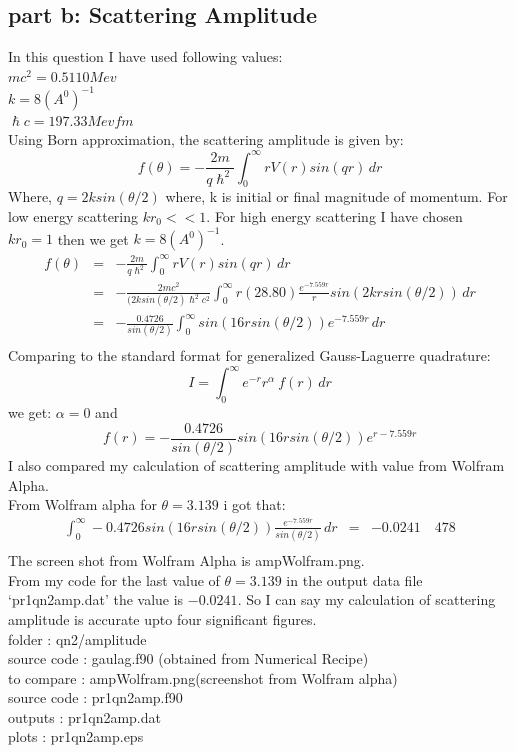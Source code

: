 \documentclass[11pt,a4paper,english]{article}
\newcommand{\no}{\nonumber}
\newcommand{\beq}{\begin{equation}}
\newcommand{\eeq}{\end{equation}}
\newcommand{\beqa}{\begin{eqnarray}}
\newcommand{\eeqa}{\end{eqnarray}}
\newcommand{\bdm}{\begin{displaymath}}
\newcommand{\edm}{\end{displaymath}}
\begin{document}
	
	\subsection{part b: Scattering Amplitude}
In this question I have used following values:\\
$ mc^{2} = 0.5110 Mev $\\
$ k = 8 (A^{0})^{-1} $\\
$ \hslash c = 197.33 Mev fm $\\
Using Born approximation, the scattering amplitude is given by:\\
\beq
f(\theta)= -\frac{2m}{q\hslash^{2}}\!\! \int_0^\infty \!\! r V(r) sin(qr) \, dr
\eeq
Where, $ q=2ksin(\theta/2) $
where, k is initial or final magnitude of momentum. For low energy scattering $ kr_{0}<< 1$.
For high energy scattering I have chosen $ kr_{0} = 1$ then we get $ k = 8 (A^{0})^{-1} $.
\beqa
f(\theta) &=& -\frac{2m}{q\hslash^{2}}\!\! \int_0^\infty \!\! r V(r) sin(qr) \, dr \\
&=& -\frac{2mc^{2}}{(2ksin(\theta/2)\hslash^{2}c^{2}}\!\! \int_0^\infty \!\! r (28.80) \frac{ e^{-7.559r}}{r} sin(2krsin(\theta/2))  \, dr \no\\
&=& -\frac{0.4726}{sin(\theta/2)}\!\! \int_0^\infty \!\! sin(16rsin(\theta/2)) e^{-7.559r}\,dr  \no\\
\eeqa
Comparing to the standard format for generalized Gauss-Laguerre quadrature:\\
\bdm
I = \int_0^\infty \!\! e^{-r}r^{\alpha}\ \!f(r)\,dr 
\edm
we get:
$\alpha = 0 $ and \\
\bdm
f(r) = -\frac{0.4726}{sin(\theta/2)} sin(16rsin(\theta/2)) e^{r-7.559r}
\edm
I also compared my calculation of scattering amplitude with value from Wolfram Alpha.\\
From Wolfram alpha for $\theta=3.139$ i got that:\\
\beqa
\int_0^\infty \!\! -0.4726 sin(16rsin(\theta/2))  \frac{e^{-7.559r}}{sin(\theta/2)}  \,dr &=& -0.0241 \quad 478   \no\\
\eeqa
The screen shot from Wolfram Alpha is ampWolfram.png.\\
From my code for the last value of $\theta=3.139$ in the output data file `pr1qn2amp.dat' the value is $-0.0241$. So I can say my calculation of scattering amplitude is accurate upto four significant figures.\\
    folder       : qn2/amplitude\\
	source code  : gaulag.f90   (obtained from Numerical Recipe)\\
	to compare   : ampWolfram.png(screenshot from Wolfram alpha)\\
	source code  : pr1qn2amp.f90\\
	outputs      : pr1qn2amp.dat\\
	plots        : pr1qn2amp.eps\\
	
\end{document}
